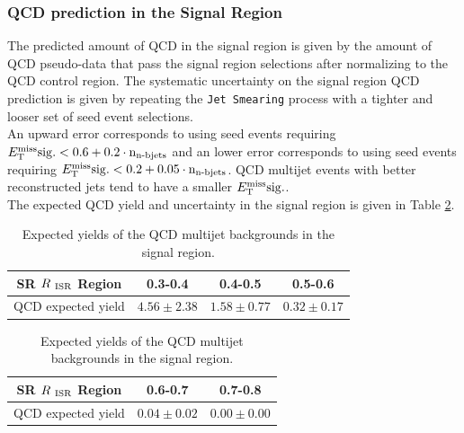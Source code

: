 \subsubsection{QCD prediction in the Signal Region}

\indent The predicted amount of QCD in the signal region is given by the amount of QCD pseudo-data that pass the signal region selections after normalizing to the QCD control region. The systematic uncertainty on the signal region QCD prediction is given by repeating the {\tt Jet Smearing} process with a tighter and looser set of seed event selections.  \\

\indent An upward error corresponds to using seed events requiring $E_{\mathrm{T}}^{\mathrm{miss}}\rm{sig.} < 0.6 + 0.2\cdot n_{\textup{n-bjets}}$ and an lower error corresponds to using seed events requiring $E_{\mathrm{T}}^{\mathrm{miss}}\rm{sig.} < 0.2 + 0.05\cdot n_{\textup{n-bjets}}$. QCD multijet events with better reconstructed jets tend to have a smaller $E_{\mathrm{T}}^{\mathrm{miss}}\rm{sig.}$. \\

\indent The expected QCD yield and uncertainty in the signal region is given in Table \ref{tab:QCDYields}.\\

\begin{table}[!h]
  \begin{center}
    \begin{tabular}{c|c|c|c} \hline\hline
SR $R_{~\mathrm{ISR}}$ Region       & 0.3-0.4              & 0.4-0.5              & 0.5-0.6              \\ \hline
QCD expected yield & $4.56\pm2.38$ & $1.58\pm0.77$ & $0.32\pm0.17$  \\ \hline \hline
    \end{tabular}
        \begin{tabular}{c|c|c} \hline\hline
SR $R_{~\mathrm{ISR}}$ Region         & 0.6-0.7             & 0.7-0.8 \\ \hline
QCD expected yield       & $0.04\pm0.02$ & $0.00\pm0.00$ \\ \hline \hline
    \end{tabular}
  \caption{Expected yields of the QCD multijet backgrounds in the signal region.}
  \label{tab:QCDYields}
  \end{center}
\end{table}%
